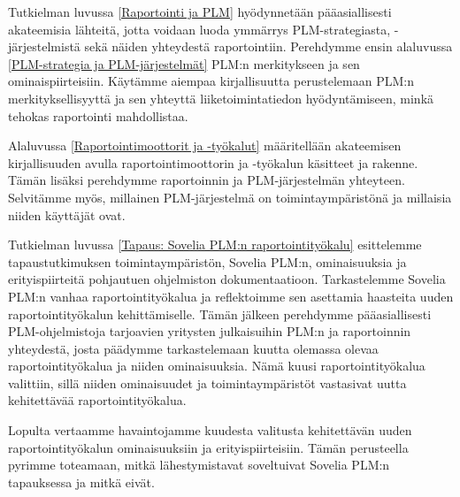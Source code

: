 Tutkielman luvussa \ref{Raportointi ja PLM} hyödynnetään pääasiallisesti akateemisia lähteitä, jotta voidaan luoda ymmärrys PLM-strategiasta, -järjestelmistä sekä näiden yhteydestä raportointiin. Perehdymme ensin alaluvussa \ref{PLM-strategia ja PLM-järjestelmät} PLM:n merkitykseen ja sen ominaispiirteisiin. Käytämme aiempaa kirjallisuutta perustelemaan PLM:n merkityksellisyyttä ja sen yhteyttä liiketoimintatiedon hyödyntämiseen, minkä tehokas raportointi mahdollistaa.

Alaluvussa \ref{Raportointimoottorit ja -työkalut} määritellään akateemisen kirjallisuuden avulla raportointimoottorin ja -työkalun käsitteet ja rakenne. Tämän lisäksi perehdymme raportoinnin ja PLM-järjestelmän yhteyteen. Selvitämme myös, millainen PLM-järjestelmä on toimintaympäristönä ja millaisia niiden käyttäjät ovat.

Tutkielman luvussa \ref{Tapaus: Sovelia PLM:n raportointityökalu} esittelemme tapaustutkimuksen toimintaympäristön, Sovelia PLM:n, ominaisuuksia ja erityispiirteitä pohjautuen ohjelmiston dokumentaatioon. Tarkastelemme Sovelia PLM:n vanhaa raportointityökalua ja reflektoimme sen asettamia haasteita uuden raportointityökalun kehittämiselle. Tämän jälkeen perehdymme pääasiallisesti PLM-ohjelmistoja tarjoavien yritysten julkaisuihin PLM:n ja raportoinnin yhteydestä, josta päädymme tarkastelemaan kuutta olemassa olevaa raportointityökalua ja niiden ominaisuuksia. Nämä kuusi raportointityökalua valittiin, sillä niiden ominaisuudet ja toimintaympäristöt vastasivat uutta kehitettävää raportointityökalua.

Lopulta vertaamme havaintojamme kuudesta valitusta kehitettävän uuden raportointityökalun ominaisuuksiin ja erityispiirteisiin. Tämän perusteella pyrimme toteamaan, mitkä lähestymistavat soveltuivat Sovelia PLM:n tapauksessa ja mitkä eivät.

